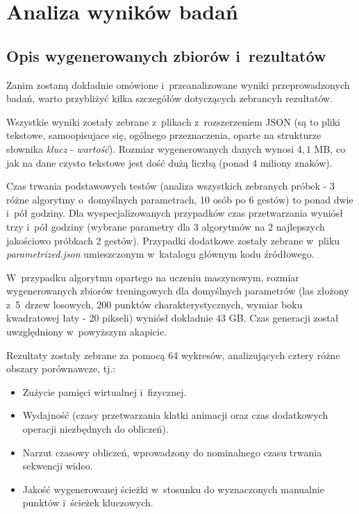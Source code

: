 \chapter{Analiza wyników badań}\label{Chapter_AnalizaRezultatow}

  \section{Opis wygenerowanych zbiorów i~rezultatów}\label{Section_Results}
    Zanim zostaną dokładnie omówione i~przeanalizowane wyniki przeprowadzonych badań, warto przybliżyć kilka szczegółów dotyczących zebrancyh rezultatów.

    Wszystkie wyniki zostały zebrane z~plikach z~rozszerzeniem JSON (są to pliki tekstowe, samoopisujace się, ogólnego przeznaczenia, oparte na strukturze słownika \textit{klucz} - \textit{wartość}). Rozmiar wygenerowanych danych wynosi $4,1$ MB, co jak na dane czysto tekstowe jest dość dużą liczbą (ponad 4 miliony znaków).

    Czas trwania podstawowych testów (analiza wszystkich zebranych próbek - 3 różne algorytmy o~domyślnych parametrach, 10 osób po 6 gestów) to ponad dwie i~pół godziny. Dla wyspecjalizowanych przypadków czas przetwarzania wyniósł trzy i~pół godziny (wybrane parametry dla 3 algorytmów na 2 najlepszych jakościowo próbkach 2 gestów). Przypadki dodatkowe zostały zebrane w~pliku \textit{parametrized.json} umieszczonym w~katalogu głównym kodu źródłowego.

    W~przypadku algorytmu opartego na uczeniu maszynowym, rozmiar wygenerowanych zbiorów treningowych dla domyślnych parametrów (las złożony z~5~drzew losowych, 200 punktów charakterystycznych, wymiar boku kwadratowej łaty - 20 pikseli) wyniósł dokładnie $43$ GB. Czas generacji został uwzględniony w~powyższym akapicie.

    Rezultaty zostały zebrane za pomocą 64 wykresów, analizujących cztery różne obszary porównawcze, tj.:
    \begin{itemize}
      \item Zużycie pamięci wirtualnej i~fizycznej.
      \item Wydajność (czasy przetwarzania klatki animacji oraz czas dodatkowych operacji niezbędnych do obliczeń).
      \item Narzut czasowy obliczeń, wprowadzony do nominalnego czasu trwania sekwencji wideo.
      \item Jakość wygenerowanej ścieżki w~stosunku do wyznaczonych manualnie punktów i~ścieżek kluczowych.
    \end{itemize}

